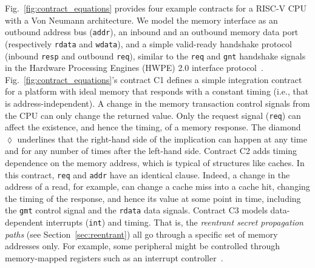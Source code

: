 Fig.~\ref{fig:contract_equations} provides four example contracts for a RISC-V CPU with a Von Neumann architecture.
We model the memory interface as an outbound address bus (\texttt{addr}), an inbound and an outbound memory data port (respectively \texttt{rdata} and \texttt{wdata}), and a simple valid-ready handshake protocol (inbound \texttt{resp} and outbound \texttt{req}), similar to the \texttt{req} and \texttt{gnt} handshake signals in the Hardware Processing Engines (HWPE) 2.0 interface protocol~\cite{pulpHWPEMem}.
Fig.~\ref{fig:contract_equations}'s contract C1 defines a simple integration contract for a platform with ideal memory that responds with a constant timing (i.e., that is address-independent).
A change in the memory transaction control signals from the CPU can only change the returned value.
Only the request signal (\texttt{req}) can affect the existence, and hence the timing, of a memory response.
The diamond $\lozenge$ underlines that the right-hand side of the implication can happen at any time and for any number of times after the left-hand side.
Contract C2 adds timing dependence on the memory address, which is typical of structures like caches.
In this contract, \texttt{req} and \texttt{addr} have an identical clause. Indeed, a change in the address of a read, for example, can change a cache miss into a cache hit, changing the timing of the response, and hence its value at some point in time, including the \texttt{gmt} control signal and the \texttt{rdata} data signals.
Contract C3 models data-dependent interrupts (\texttt{int}) and timing.
That is, the \emph{reentrant secret propagation paths} (see Section~\ref{sec:reentrant}) all go through a specific set of memory addresses only.
For example, some peripheral might be controlled through memory-mapped registers such as an interrupt controller~\cite{riscv_plic_spec_1_0_0}.

